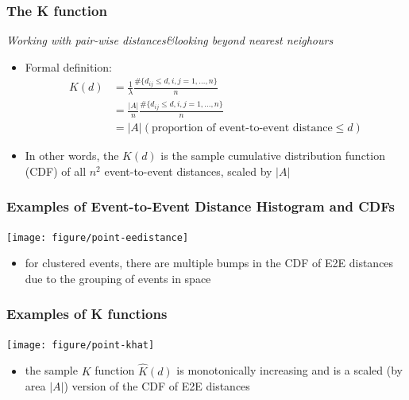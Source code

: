 \documentclass[10pt]{beamer}\usepackage[]{graphicx}\usepackage[]{color}
\newcommand{\bitemize}{\begin{itemize}}
\newcommand{\eitemize}{\end{itemize}}
\begin{document}
\begin{frame}
\frametitle{The K function}
{\it \small Working with pair-wise distances\&looking beyond nearest neighours}
\bitemize
\item Formal definition:
\begin{align*}
K(d) &= \frac{1}{\lambda}\frac{\# \{d_{ij}\leq d, i, j=1,\ldots, n\}}{n} \\
&=\frac{|A|}{n}\frac{\# \{d_{ij}\leq d, i, j=1,\ldots, n\}}{n} \\
&= |A|(\mbox{proportion of event-to-event distance} \leq d)
\end{align*}
\item In other words, the $\hat{K}(d)$ is the sample cumulative distribution
function (CDF) of all $n^2$ event-to-event distances, scaled by $|A|$
\eitemize
\end{frame}

\begin{frame}
\frametitle{Examples of Event-to-Event Distance Histogram and CDFs}



{\centering \texttt{[image: figure/point-eedistance]} 

}




\bitemize
\item for clustered events, there are multiple bumps in the CDF of E2E
distances due to the grouping of events in space
\eitemize
\end{frame}

\begin{frame}
\frametitle{Examples of K functions}



{\centering \texttt{[image: figure/point-khat]} 

}




\bitemize
\item the sample $K$ function $\hat{K} (d)$ is monotonically increasing and is a
scaled (by area $|A|$) version of the CDF of E2E distances
\eitemize
\end{frame}
\end{document}
